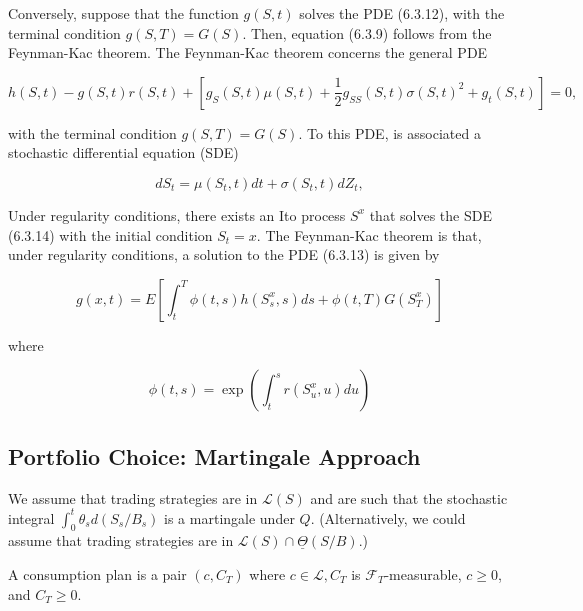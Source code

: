 \documentclass[\topdir/lecture\_notes.tex]{subfiles}
\begin{document}
Conversely, suppose that the function $g(S, t)$ solves the PDE (6.3.12), with the terminal condition $g(S, T)=G(S)$. Then, equation (6.3.9) follows from the Feynman-Kac theorem. The Feynman-Kac theorem concerns the general PDE

\begin{equation}
h(S, t)-g(S, t) r(S, t)+\left[g_{S}(S, t) \mu(S, t)+\frac{1}{2} g_{S S}(S, t) \sigma(S, t)^{2}+g_{t}(S, t)\right]=0, \label{eq:6.3.13}
\end{equation}

with the terminal condition $g(S, T)=G(S)$. To this PDE, is associated a stochastic differential equation (SDE)

\begin{equation}
d S_{t}=\mu\left(S_{t}, t\right) d t+\sigma\left(S_{t}, t\right) d Z_{t}, \label{eq:6.3.14}
\end{equation}

Under regularity conditions, there exists an Ito process $S^{x}$ that solves the SDE (6.3.14) with the initial condition $S_{t}=x$. The Feynman-Kac theorem is that, under regularity conditions, a solution to the PDE (6.3.13) is given by

\begin{equation}
g(x, t)=E\left[\int_{t}^{T} \phi(t, s) h\left(S_{s}^{x}, s\right) d s+\phi(t, T) G\left(S_{T}^{x}\right)\right]
\end{equation}

where

\begin{equation}
\phi(t, s)=\exp \left(\int_{t}^{s} r\left(S_{u}^{x}, u\right) d u\right)
\end{equation}



\subsection{Portfolio Choice: Martingale Approach}
We assume that trading strategies are in $\mathcal{L}(S)$ and are such that the stochastic integral $\int_{0}^{t} \theta_{s} d\left(S_{s} / B_{s}\right)$ is a martingale under $Q$. (Alternatively, we could assume that trading strategies are in $\mathcal{L}(S) \cap \underline{\Theta}(S / B)$.)

\begin{defn}\label{def:6.5.1}
A consumption plan is a pair $\left(c, C_{T}\right)$ where $c \in \mathcal{L}, C_{T}$ is $\mathcal{F}_{T}$-measurable, $c \geq 0$, and $C_{T} \geq 0$.
\end{defn}
\end{document}
